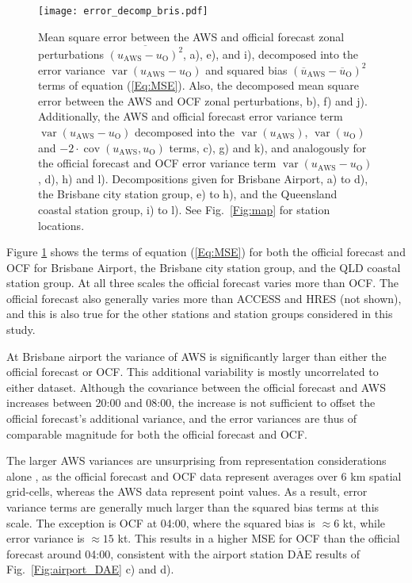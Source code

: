 \documentclass{ametsoc}
\DeclareMathOperator{\cov}{cov}
\DeclareMathOperator{\var}{var}
\begin{document}
\begin{figure}
\centering
\texttt{[image: error\_decomp\_bris.pdf]}
\caption{Mean square error between the AWS and official forecast zonal perturbations $\overline{\left(u_\text{AWS} - u_\text{O}\right)^2}$, a), e), and i), decomposed into the error variance $\var\left(u_\text{AWS} - u_\text{O}\right)$ and squared bias $\left(\overline{u}_\text{AWS} - \overline{u}_\text{O}\right)^2$ terms of equation (\ref{Eq:MSE}). Also, the decomposed mean square error between the AWS and OCF zonal perturbations, b), f) and j). Additionally, the AWS and official forecast error variance term $\var\left(u_\text{AWS} - u_\text{O}\right)$ decomposed into the $\var\left(u_\text{AWS}\right)$, $\var\left(u_\text{O}\right)$ and  $- 2 \cdot \cov\left(u_\text{AWS}, u_\text{O}\right)$ terms, c), g) and k), and analogously for the official forecast and OCF error variance term $\var\left(u_\text{AWS} - u_\text{O}\right)$, d), h) and l). Decompositions given for Brisbane Airport, a) to d), the Brisbane city station group, e) to h), and the Queensland coastal station group, i) to l). See Fig.~\ref{Fig:map} for station locations.}
\label{Fig:error_decomp_bris}
\end{figure}

Figure \ref{Fig:error_decomp_bris} shows the terms of equation (\ref{Eq:MSE}) for both the official forecast and OCF for Brisbane Airport, the Brisbane city station group, and the QLD coastal station group. At all three scales the official forecast varies more than OCF. The official forecast also generally varies more than ACCESS and HRES (not shown), and this is also true for the other stations and station groups considered in this study. 

At Brisbane airport the variance of AWS is significantly larger than either the official forecast or OCF. This additional variability is mostly uncorrelated to either dataset. Although the covariance between the official forecast and AWS increases between 20:00 and 08:00, the increase is not sufficient to offset the official forecast's additional variance, and the error variances are thus of comparable magnitude for both the official forecast and OCF. 

The larger AWS variances are unsurprising from representation considerations alone \citep[e.g.][]{zaron06}, as the official forecast and OCF data represent averages over 6 km spatial grid-cells, whereas the AWS data represent point values. As a result, error variance terms are generally much larger than the squared bias terms at this scale. The exception is OCF at 04:00, where the squared bias is $\approx 6$ kt, while error variance is $\approx 15$ kt. This results in a higher MSE for OCF than the official forecast around 04:00, consistent with the airport station $\overline{\text{DAE}}$ results of Fig.~\ref{Fig:airport_DAE} c) and d).
\end{document}
